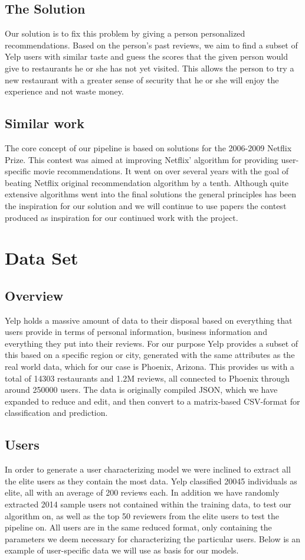 \documentclass[10pt,twocolumn,letterpaper]{article}
\begin{document}
\subsection{The Solution}
Our solution is to fix this problem by giving a person personalized recommendations. Based on the person's past reviews, we aim to find a subset of Yelp users with similar taste and guess the scores that the given person would give to restaurants he or she has not yet visited. This allows the person to try a new restaurant with a greater sense of security that he or she will enjoy the experience and not waste money.
\subsection{Similar work}
The core concept of our pipeline is based on solutions for the 2006-2009 Netflix Prize. This contest was aimed at improving Netflix' algorithm for providing user-specific movie recommendations. It went on over several years with the goal of beating Netflix original recommendation algorithm by a tenth. Although quite extensive algorithms went into the final solutions the general principles has been the inspiration for our solution and we will continue to use papers the contest produced as inspiration for our continued work with the project\cite{KorBell}\cite{BellKor}.

\section{Data Set}
\subsection{Overview}
Yelp holds a massive amount of data to their disposal based on everything that users provide in terms of personal information, business information and everything they put into their reviews. For our purpose Yelp provides a subset of this based on a specific region or city, generated with the same attributes as the real world data, which for our case is Phoenix, Arizona. This provides us with a total of 14303 restaurants and 1.2M reviews, all connected to Phoenix through around 250000 users. The data is originally compiled JSON, which we have expanded to reduce and edit, and then convert to a matrix-based CSV-format for classification and prediction.

\subsection{Users}
In order to generate a user characterizing model we were inclined to extract all the elite users as they contain the most data. Yelp classified 20045 individuals as elite, all with an average of 200 reviews each. In addition we have randomly extracted 2014 sample users not contained within the training data, to test our algorithm on, as well as the top 50 reviewers from the elite users to test the pipeline on. All users are in the same reduced format, only containing the parameters we deem necessary for characterizing the particular users. Below is an example of user-specific data we will use as basis for our models.
\end{document}
